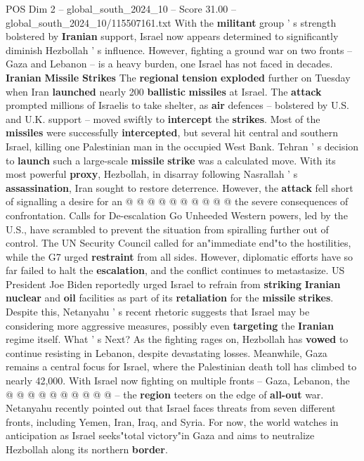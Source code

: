 \begin{textsample}{POS Dim 2 – global\_south\_2024\_10 – Score 31.00 – global\_south\_2024\_10/115507161.txt}
With the \textbf{militant} group ' s strength bolstered by \textbf{Iranian} support, Israel now appears determined to significantly diminish Hezbollah ' s influence.
However, fighting a ground war on two fronts -- Gaza and Lebanon -- is a heavy burden, one Israel has not faced in decades. \textbf{Iranian} \textbf{Missile} \textbf{Strikes} The \textbf{regional} \textbf{tension} \textbf{exploded} further on Tuesday when Iran \textbf{launched} nearly 200 \textbf{ballistic} \textbf{missiles} at Israel.
The \textbf{attack} prompted millions of Israelis to take shelter, as \textbf{air} defences -- bolstered by U.S. and U.K. support -- moved swiftly to \textbf{intercept} the \textbf{strikes}.
Most of the \textbf{missiles} were successfully \textbf{intercepted}, but several hit central and southern Israel, killing one Palestinian man in the occupied West Bank.
Tehran ' s decision to \textbf{launch} such a large-scale \textbf{missile} \textbf{strike} was a calculated move.
With its most powerful \textbf{proxy}, Hezbollah, in disarray following Nasrallah ' s \textbf{assassination}, Iran sought to restore deterrence.
However, the \textbf{attack} fell short of signalling a desire for an @ @ @ @ @ @ @ @ @ @ the severe consequences of confrontation.
Calls for De-escalation Go Unheeded Western powers, led by the U.S., have scrambled to prevent the situation from spiralling further out of control.
The UN Security Council called for an"immediate end"to the hostilities, while the G7 urged \textbf{restraint} from all sides.
However, diplomatic efforts have so far failed to halt the \textbf{escalation}, and the conflict continues to metastasize.
US President Joe Biden reportedly urged Israel to refrain from \textbf{striking} \textbf{Iranian} \textbf{nuclear} and \textbf{oil} facilities as part of its \textbf{retaliation} for the \textbf{missile} \textbf{strikes}.
Despite this, Netanyahu ' s recent rhetoric suggests that Israel may be considering more aggressive measures, possibly even \textbf{targeting} the \textbf{Iranian} regime itself.
What ' s Next?
As the fighting rages on, Hezbollah has \textbf{vowed} to continue resisting in Lebanon, despite devastating losses.
Meanwhile, Gaza remains a central focus for Israel, where the Palestinian death toll has climbed to nearly 42,000.
With Israel now fighting on multiple fronts -- Gaza, Lebanon, the @ @ @ @ @ @ @ @ @ @ -- the \textbf{region} teeters on the edge of \textbf{all-out} war.
Netanyahu recently pointed out that Israel faces threats from seven different fronts, including Yemen, Iran, Iraq, and Syria.
For now, the world watches in anticipation as Israel seeks"total victory"in Gaza and aims to neutralize Hezbollah along its northern \textbf{border}.

\end{textsample}
